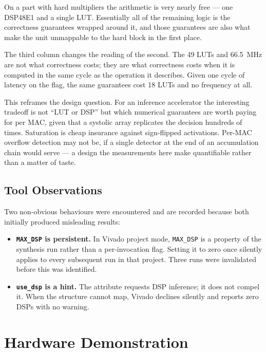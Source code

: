 \documentclass[letterpaper,12pt]{article}
\begin{document}
On a part with hard multipliers the arithmetic is very nearly free --- one
DSP48E1 and a single LUT. Essentially all of the remaining logic is the
correctness guarantees wrapped around it, and those guarantees are also what
make the unit unmappable to the hard block in the first place.

The third column changes the reading of the second. The 49 LUTs and 66.5~MHz
are not what correctness costs; they are what correctness costs when it is
computed in the same cycle as the operation it describes. Given one cycle of
latency on the flag, the same guarantees cost 18 LUTs and no frequency at all.

This reframes the design question. For an inference accelerator the interesting
tradeoff is not ``LUT or DSP'' but which numerical guarantees are worth paying
for per MAC, given that a systolic array replicates the decision hundreds of
times. Saturation is cheap insurance against sign-flipped activations.
Per-MAC overflow detection may not be, if a single detector at the end of an
accumulation chain would serve --- a design the measurements here make
quantifiable rather than a matter of taste.

\subsection{Tool Observations}

Two non-obvious behaviours were encountered and are recorded because both
initially produced misleading results:

\begin{itemize}
    \item \textbf{\texttt{MAX\_DSP} is persistent.} In Vivado project mode,
    \texttt{MAX\_DSP} is a property of the synthesis run rather than a
    per-invocation flag. Setting it to zero once silently applies to every
    subsequent run in that project. Three runs were invalidated before this was
    identified.
    \item \textbf{\texttt{use\_dsp} is a hint.} The attribute requests DSP
    inference; it does not compel it. When the structure cannot map, Vivado
    declines silently and reports zero DSPs with no warning.
\end{itemize}

\section{Hardware Demonstration}
\end{document}
